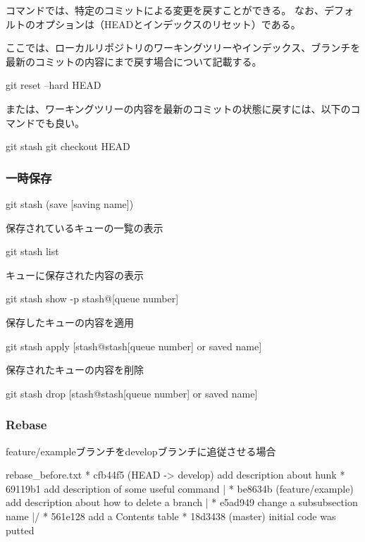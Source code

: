 \documentclass[10pt,a4j,openany,dvipdfmx]{jsarticle}
\begin{document}
コマンドでは、特定のコミットによる変更を戻すことができる。
なお、デフォルトのオプションは（HEADとインデックスのリセット）である。

ここでは、ローカルリポジトリのワーキングツリーやインデックス、ブランチを最新のコミットの内容にまで戻す場合について記載する。
\begin{commandshell}
git reset --hard HEAD
\end{commandshell}

または、ワーキングツリーの内容を最新のコミットの状態に戻すには、以下のコマンドでも良い。
\begin{commandshell}
git stash
git checkout HEAD
\end{commandshell}

\subsubsection{一時保存} %
\label{ssub:一時保存}

\begin{commandshell}
git stash (save [saving name]) 
\end{commandshell}

保存されているキューの一覧の表示
\begin{commandshell}
git stash list
\end{commandshell}

キューに保存された内容の表示
\begin{commandshell}
git stash show -p stash@{[queue number]}
\end{commandshell}

保存したキューの内容を適用
\begin{commandshell}
git stash apply [stash@{stash[queue number]} or saved name]
\end{commandshell}

保存されたキューの内容を削除
\begin{commandshell}
git stash drop [stash@{stash[queue number]} or saved name]
\end{commandshell}

\subsubsection{Rebase} %
\label{ssub:rebase}



feature/exampleブランチをdevelopブランチに追従させる場合
\begin{filecontents}{rebase_before.txt}
* cfb44f5 (HEAD -> develop) add description about hunk
* 69119b1 add description of some useful command
| * be8634b (feature/example) add description about how to delete a branch
| * e5ad949 change a subsubsection name
|/  
* 561e128 add a Contents table
* 18d3438 (master) initial code was putted
\end{filecontents}
\end{document}
